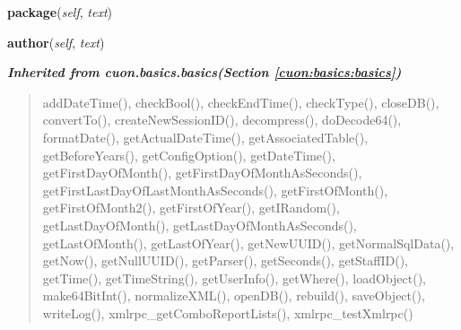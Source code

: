     \label{cuon:Reports:report2_latex:report2:package}

    \vspace{0.5ex}

\hspace{.8\funcindent}\begin{boxedminipage}{\funcwidth}

    \raggedright \textbf{package}(\textit{self}, \textit{text})

\setlength{\parskip}{2ex}
\setlength{\parskip}{1ex}
    \end{boxedminipage}

    \label{cuon:Reports:report2_latex:report2:author}

    \vspace{0.5ex}

\hspace{.8\funcindent}\begin{boxedminipage}{\funcwidth}

    \raggedright \textbf{author}(\textit{self}, \textit{text})

\setlength{\parskip}{2ex}
\setlength{\parskip}{1ex}
    \end{boxedminipage}


\large{\textbf{\textit{Inherited from cuon.basics.basics\textit{(Section \ref{cuon:basics:basics})}}}}

\begin{quote}
addDateTime(), checkBool(), checkEndTime(), checkType(), closeDB(), convertTo(), createNewSessionID(), decompress(), doDecode64(), formatDate(), getActualDateTime(), getAssociatedTable(), getBeforeYears(), getConfigOption(), getDateTime(), getFirstDayOfMonth(), getFirstDayOfMonthAsSeconds(), getFirstLastDayOfLastMonthAsSeconds(), getFirstOfMonth(), getFirstOfMonth2(), getFirstOfYear(), getIRandom(), getLastDayOfMonth(), getLastDayOfMonthAsSeconds(), getLastOfMonth(), getLastOfYear(), getNewUUID(), getNormalSqlData(), getNow(), getNullUUID(), getParser(), getSeconds(), getStaffID(), getTime(), getTimeString(), getUserInfo(), getWhere(), loadObject(), make64BitInt(), normalizeXML(), openDB(), rebuild(), saveObject(), writeLog(), xmlrpc\_getComboReportLists(), xmlrpc\_testXmlrpc()
\end{quote}

